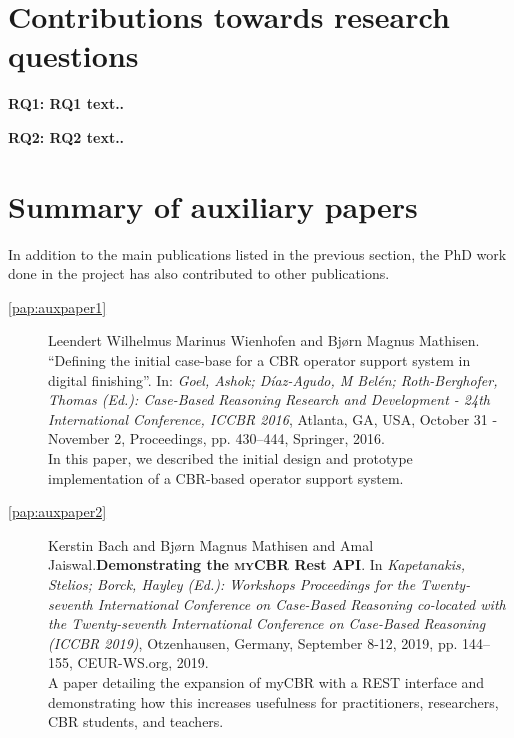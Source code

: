 \section{Contributions towards research questions}
\label{results:sec:rqs}

\lipsum[6-7]


\textbf{RQ1: RQ1 text..}
\label{results:sec:rq2}
\lipsum[6-7]

\textbf{RQ2: RQ2 text..}
\label{results:sec:rq3}
\lipsum[6-7]

\section{Summary of auxiliary papers}
\label{summary:auxiliarypapers}

In addition to the main publications listed in the previous section, the PhD
work done in the project has also contributed to other publications.
\lipsum[6-7]

\begin{description}
\item[\cref{pap:auxpaper1}] Leendert Wilhelmus Marinus Wienhofen and
  Bjørn Magnus Mathisen. \enquote{Defining the initial case-base for a
    CBR operator support system in digital finishing}. In: \emph{Goel, Ashok;
    D{\'i}az-Agudo, M Bel{\'e}n; Roth-Berghofer, Thomas (Ed.): Case-Based Reasoning Research and Development - 24th
    International Conference, ICCBR 2016}, Atlanta, GA, USA, October 31 - November 2,
    Proceedings, pp. 430–444, Springer, 2016.\\
    In this paper, we described the initial design and prototype implementation of a
    CBR-based operator support system.
  \item[\cref{pap:auxpaper2}] Kerstin Bach and Bjørn Magnus Mathisen and Amal Jaiswal.\textbf{Demonstrating the \protect\textsc{myCBR} Rest
      API}. In \emph{Kapetanakis, Stelios; Borck, Hayley (Ed.): Workshops
      Proceedings for the Twenty-seventh International Conference on Case-Based
      Reasoning co-located with the Twenty-seventh International Conference on
      Case-Based Reasoning (ICCBR 2019)}, Otzenhausen, Germany, September 8-12,
    2019, pp. 144–155, CEUR-WS.org, 2019. \\
    A paper detailing the expansion of myCBR with a REST interface and demonstrating how this increases usefulness
    for practitioners, researchers, CBR students, and teachers.
  \end{description}

